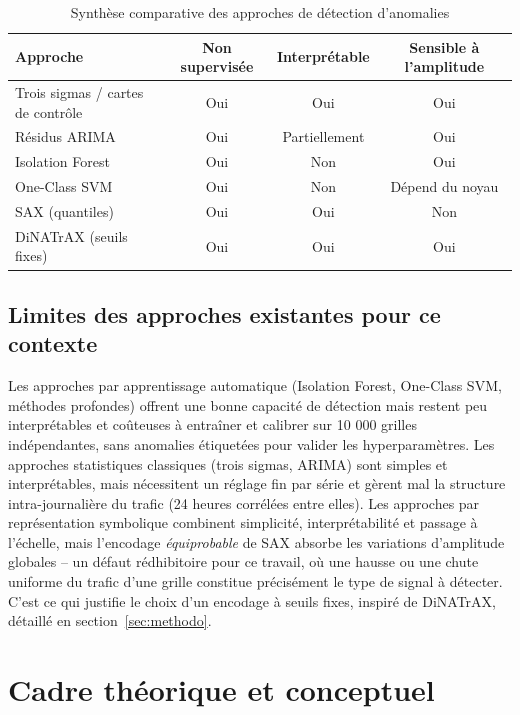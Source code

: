 \begin{table}[htbp]
  \centering
  \caption{Synthèse comparative des approches de détection d'anomalies}
  \label{tab:comparatif}
  \begin{tabular}{lccc}
    \toprule
    \textbf{Approche} & \textbf{Non supervisée} & \textbf{Interprétable} & \textbf{Sensible à l'amplitude} \\
    \midrule
    Trois sigmas / cartes de contrôle & Oui & Oui & Oui \\
    Résidus ARIMA                     & Oui & Partiellement & Oui \\
    Isolation Forest                  & Oui & Non & Oui \\
    One-Class SVM                     & Oui & Non & Dépend du noyau \\
    SAX (quantiles)                   & Oui & Oui & Non \\
    DiNATrAX (seuils fixes)           & Oui & Oui & Oui \\
    \bottomrule
  \end{tabular}
\end{table}

\subsection{Limites des approches existantes pour ce contexte}

Les approches par apprentissage automatique (Isolation Forest,
One-Class SVM, méthodes profondes) offrent une bonne capacité de
détection mais restent peu interprétables et coûteuses à entraîner et
calibrer sur 10 000 grilles indépendantes, sans anomalies étiquetées
pour valider les hyperparamètres. Les approches statistiques
classiques (trois sigmas, ARIMA) sont simples et interprétables, mais
nécessitent un réglage fin par série et gèrent mal la structure
intra-journalière du trafic (24 heures corrélées entre elles). Les
approches par représentation symbolique combinent simplicité,
interprétabilité et passage à l'échelle, mais l'encodage
\emph{équiprobable} de SAX absorbe les variations d'amplitude
globales -- un défaut rédhibitoire pour ce travail, où une hausse ou
une chute uniforme du trafic d'une grille constitue précisément le
type de signal à détecter. C'est ce qui justifie le choix d'un
encodage à seuils fixes, inspiré de DiNATrAX, détaillé en
section~\ref{sec:methodo}.

\clearpage
\section{Cadre théorique et conceptuel}

